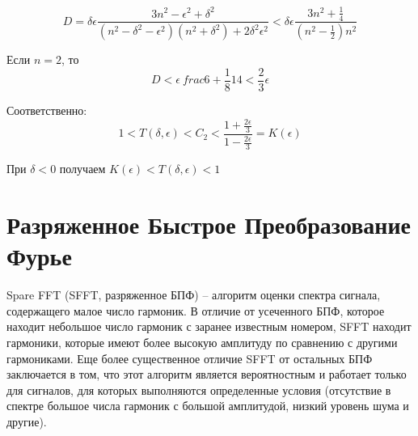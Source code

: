 \begin{equation}
	\label{eq:equation110}
	D = \delta \epsilon \frac{3n^2 - \epsilon^2 + \delta^2}{(n^2 - \delta^2 - \epsilon ^2)(n^2 + \delta ^2) + 2 \delta ^2 \epsilon^2} < \delta \epsilon \frac{3 n^2 + \frac{1}{4}}{(n^2 - \frac{1}{2})n^2}
\end{equation} 

Если $n = 2$, то
\begin{equation}
	\label{eq:equation111}
	D < \epsilon \ frac{6 + \frac{1}{8}}{14} < \frac{2}{3} \epsilon
\end{equation} 

Соответственно:
\begin{equation}
	\label{eq:equation112}
	1 < T(\delta, \epsilon) < C_{2} < \frac{1 + \frac{2 \epsilon}{3}}{1 - \frac{2 \epsilon}{3}} = K(\epsilon)
\end{equation} 

При $\delta <0$ получаем $K(\epsilon) < T(\delta, \epsilon) < 1$ 

\section{Разряженное Быстрое Преобразование Фурье} \label{sec:ch3/sect7}

Spare FFT (SFFT, разряженное БПФ) -- алгоритм оценки спектра сигнала, содержащего малое число гармоник. В отличие от усеченного БПФ, которое находит небольшое число гармоник с заранее известным номером, SFFT находит гармоники, которые имеют более высокую амплитуду по сравнению с другими гармониками. Еще более существенное отличие SFFT от остальных БПФ заключается в том, что этот алгоритм является вероятностным и работает только для сигналов, для которых выполняются определенные условия (отсутствие в спектре большое числа гармоник с большой амплитудой, низкий уровень шума и другие).

